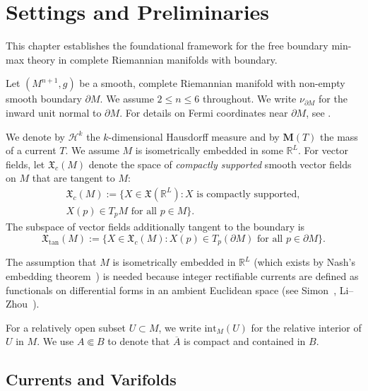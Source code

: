\chapter{Settings and Preliminaries}\label{ch:preliminaries}

This chapter establishes the foundational framework for the free boundary min-max theory in complete Riemannian manifolds with boundary.

Let $(M^{n+1}, g)$ be a smooth, complete Riemannian manifold with non-empty smooth boundary $\partial M$. We assume $2 \leq n \leq 6$ throughout. We write $\nu_{\partial M}$ for the inward unit normal to $\partial M$. For details on Fermi coordinates near $\partial M$, see \cite[Section~2]{LZ17}.

We denote by $\mathcal{H}^k$ the $k$-dimensional Hausdorff measure and by $\mathbf{M}(T)$ the mass of a current $T$. We assume $M$ is isometrically embedded in some $\mathbb{R}^L$. For vector fields, let $\mathfrak{X}_c(M)$ denote the space of \emph{compactly supported} smooth vector fields on $M$ that are tangent to $M$:
\begin{multline*}
\mathfrak{X}_c(M) := \bigl\{X \in \mathfrak{X}(\mathbb{R}^L) : X \text{ is compactly supported},\\
X(p) \in T_p M \text{ for all } p \in M\bigr\}.
\end{multline*}
The subspace of vector fields additionally tangent to the boundary is
\[
\mathfrak{X}_{\mathrm{tan}}(M) := \{X \in \mathfrak{X}_c(M) : X(p) \in T_p(\partial M) \text{ for all } p \in \partial M\}.
\]

\begin{remark}\label{rem:isometric-embedding}
The assumption that $M$ is isometrically embedded in $\mathbb{R}^L$ (which exists by Nash's embedding theorem~\cite{Nash56}) is needed because integer rectifiable currents are defined as functionals on differential forms in an ambient Euclidean space (see Simon~\cite[\S26--27]{Sim84}, Li--Zhou~\cite[\S3]{LZ17}).
\end{remark}

For a relatively open subset $U \subset M$, we write $\mathrm{int}_M(U)$ for the relative interior of $U$ in $M$. We use $A \Subset B$ to denote that $\overline{A}$ is compact and contained in $B$.


\section{Currents and Varifolds}\label{sec:currents-varifolds}

